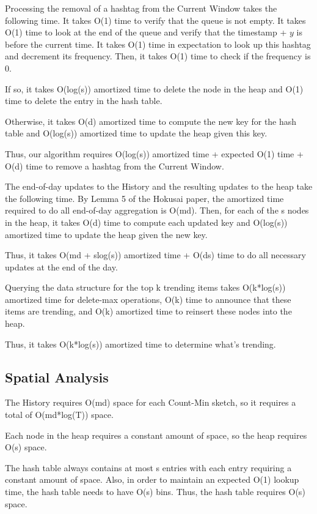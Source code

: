 \documentclass[twoside]{article}
\begin{document}
Processing the removal of a hashtag from the Current Window takes the following time.  It takes O(1) time to verify that the queue is not empty.  It takes O(1) time to look at the end of the queue and verify that the timestamp + $y$ is before the current time.  It takes O(1) time in expectation to look up this hashtag and decrement its frequency.  Then, it takes O(1) time to check if the frequency is 0.

If so, it takes O(log(s)) amortized time to delete the node in the heap and O(1) time to delete the entry in the hash table.

Otherwise, it takes O(d) amortized time to compute the new key for the hash table and O(log(s)) amortized time to update the heap given this key.

Thus, our algorithm requires O(log(s)) amortized time + expected O(1) time  + O(d) time to remove a hashtag from the Current Window.

The end-of-day updates to the History and the resulting updates to the heap take the following time.  By Lemma 5 of the Hokusai paper, the amortized time required to do all end-of-day aggregation is O(md).  Then, for each of the s nodes in the heap, it takes O(d) time to compute each updated key and O(log(s)) amortized time to update the heap given the new key.

Thus, it takes O(md + slog(s)) amortized time + O(ds) time to do all necessary updates at the end of the day.

Querying the data structure for the top k trending items takes O(k*log(s)) amortized time for delete-max operations, O(k) time to announce that these items are trending, and O(k) amortized time to reinsert these nodes into the heap.

Thus, it takes O(k*log(s)) amortized time to determine what’s trending.


\subsection{Spatial Analysis}

The History requires O(md) space for each Count-Min sketch, so it requires a total of O(md*log(T)) space.

Each node in the heap requires a constant amount of space, so the heap requires O(s) space.

The hash table always contains at most s entries with each entry requiring a constant amount of space.  Also, in order to maintain an expected O(1) lookup time, the hash table needs to have O(s) bins.  Thus, the hash table requires O(s) space.
\end{document}
